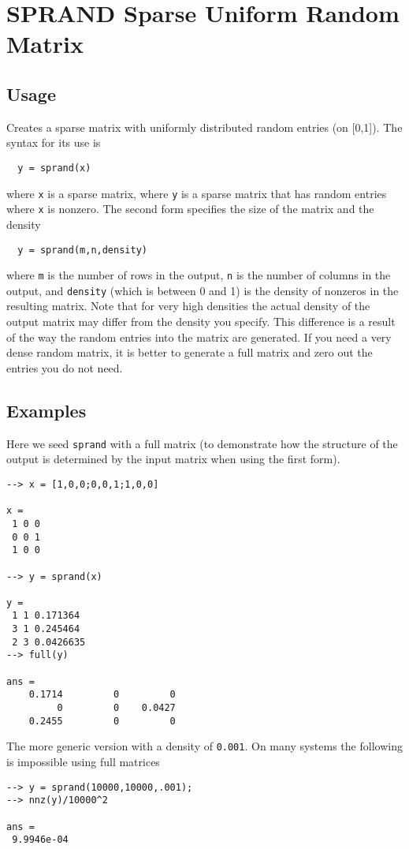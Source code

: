 \section{SPRAND Sparse Uniform Random Matrix}

\subsection{Usage}

Creates a sparse matrix with uniformly distributed random entries (on [0,1]).  The
syntax for its use is
\begin{verbatim}
  y = sprand(x)
\end{verbatim}
where \verb|x| is a sparse matrix, where \verb|y| is a sparse matrix that has
random entries where \verb|x| is nonzero.  The second form specifies the
size of the matrix and the density
\begin{verbatim}
  y = sprand(m,n,density)
\end{verbatim}
where \verb|m| is the number of rows in the output, \verb|n| is the number of 
columns in the output, and \verb|density| (which is between 0 and 1) is
the density of nonzeros in the resulting matrix.  Note that for very
high densities the actual density of the output matrix may differ from
the density you specify.  This difference is a result of the way the
random entries into the matrix are generated.  If you need a very dense
random matrix, it is better to generate a full matrix and zero out the 
entries you do not need.
\subsection{Examples}

Here we seed \verb|sprand| with a full matrix (to demonstrate how the structure
of the output is determined by the input matrix when using the first form).
\begin{verbatim}
--> x = [1,0,0;0,0,1;1,0,0]

x = 
 1 0 0 
 0 0 1 
 1 0 0 

--> y = sprand(x)

y = 
 1 1 0.171364
 3 1 0.245464
 2 3 0.0426635
--> full(y)

ans = 
    0.1714         0         0 
         0         0    0.0427 
    0.2455         0         0 
\end{verbatim}
The more generic version with a density of \verb|0.001|.  On many systems the
following is impossible using full matrices
\begin{verbatim}
--> y = sprand(10000,10000,.001);
--> nnz(y)/10000^2

ans = 
 9.9946e-04 
\end{verbatim}
